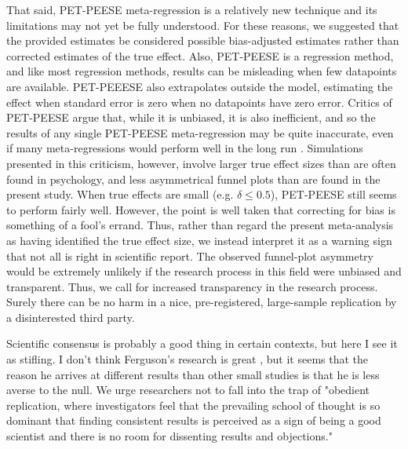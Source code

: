 \documentclass[man]{apa6}
\begin{document}
That said, PET-PEESE meta-regression is a relatively new technique and its limitations may not yet be fully understood. For these reasons, we suggested that the provided estimates be considered possible bias-adjusted estimates rather than corrected estimates of the true effect. Also, PET-PEESE is a regression method, and like most regression methods, results can be misleading when few datapoints are available. PET-PEEESE also extrapolates outside the model, estimating the effect when standard error is zero when no datapoints have zero error. 
Critics of PET-PEESE argue that, while it is unbiased, it is also inefficient, and so the results of any single PET-PEESE meta-regression may be quite inaccurate, even if many meta-regressions would perform well in the long run \citep{Reed:etal:WORKINGPAPER}. Simulations presented in this criticism, however, involve larger true effect sizes than are often found in psychology, and less asymmetrical funnel plots than are found in the present study. When true effects are small (e.g. $\delta \le 0.5$), PET-PEESE still seems to perform fairly well. However, the point is well taken that correcting for bias is something of a fool's errand.
Thus, rather than regard the present meta-analysis as having identified the true effect size, we instead interpret it as a warning sign that not all is right in scientific report. The observed funnel-plot asymmetry would be extremely unlikely if the research process in this field were unbiased and transparent. Thus, we call for increased transparency in the research process. 
Surely there can be no harm in a nice, pre-registered, large-sample replication by a disinterested third party.

Scientific consensus is probably a good thing in certain contexts, but here I see it as stifling. I don't think Ferguson's research is great \citet[and we have even criticized his research as using too small of samples, see ][]{Hilgard:etal:2015}, but it seems that the reason he arrives at different results than other small studies is that he is less averse to the null. We urge researchers not to fall into the trap of "obedient replication, where investigators feel that the prevailing school of thought is so dominant that finding consistent results is perceived as a sign of being a good scientist and there is no room for dissenting results and objections." \citep{Ioannidis:2012} %
\end{document}
